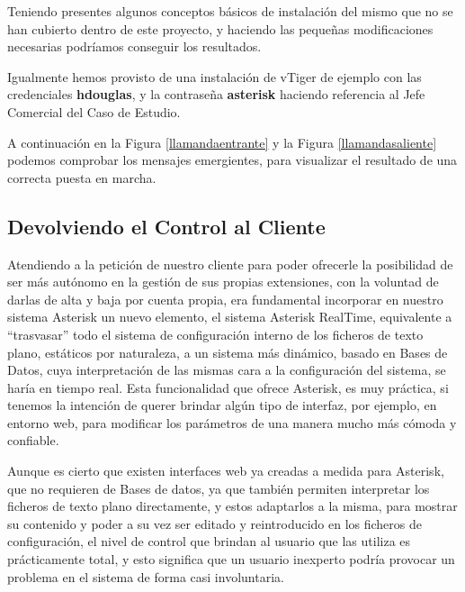 Teniendo presentes algunos conceptos básicos de instalación del mismo que no se han cubierto dentro de este proyecto, y haciendo las pequeñas modificaciones necesarias podríamos conseguir los resultados.

Igualmente hemos provisto de una instalación de vTiger de ejemplo con las credenciales \textbf{hdouglas}, y la contraseña \textbf{asterisk} haciendo referencia al Jefe Comercial del Caso de Estudio.

A continuación en la Figura \ref{llamandaentrante} y la Figura \ref{llamandasaliente} podemos comprobar los mensajes emergientes, para visualizar el resultado de una correcta puesta en marcha.



\newpage

\subsection{Devolviendo el Control al Cliente}

Atendiendo a la petición de nuestro cliente para poder ofrecerle la posibilidad de ser más autónomo en la gestión de sus propias extensiones, con la voluntad de darlas de alta y baja por cuenta propia, era fundamental incorporar en nuestro sistema Asterisk un nuevo elemento, el sistema Asterisk RealTime, equivalente a ``trasvasar'' todo el sistema de configuración interno de los ficheros de texto plano, estáticos por naturaleza, a un sistema más dinámico, basado en Bases de Datos, cuya interpretación de las mismas cara a la configuración del sistema, se haría en tiempo real. Esta funcionalidad que ofrece Asterisk, es muy práctica, si tenemos la intención de querer brindar algún tipo de interfaz, por ejemplo, en entorno web, para modificar los parámetros de una manera mucho más cómoda y confiable.

Aunque es cierto que existen interfaces web ya creadas a medida para Asterisk, que no requieren de Bases de datos, ya que también permiten interpretar los ficheros de texto plano directamente, y estos adaptarlos a la misma, para mostrar su contenido y poder a su vez ser editado y reintroducido en los ficheros de configuración, el nivel de control que brindan al usuario que las utiliza es prácticamente total, y esto significa que un usuario inexperto podría provocar un problema en el sistema de forma casi involuntaria. 

